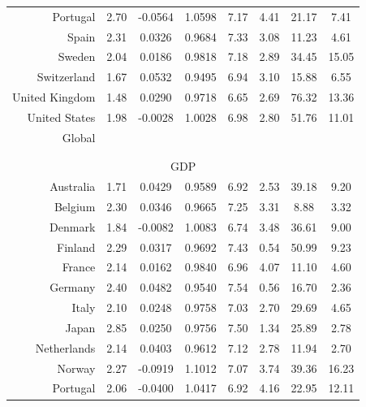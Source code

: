 {{\begin{table}[p]
\begin{center}
\begin{tabular}{rccccccc}
Portugal & 2.70 & -0.0564 & 1.0598 & 7.17 & 4.41 & 21.17 &  7.41\\ 

Spain & 2.31 & 0.0326 & 0.9684 & 7.33 & 3.08 & 11.23 &  4.61\\ 

Sweden & 2.04 & 0.0186 & 0.9818 & 7.18 & 2.89 & 34.45 &  15.05\\ 

Switzerland & 1.67 & 0.0532 & 0.9495 & 6.94 & 3.10 & 15.88 &  6.55\\ 

United Kingdom & 1.48 & 0.0290 & 0.9718 & 6.65 & 2.69 & 76.32 &  13.36\\ 

United States & 1.98 & -0.0028 & 1.0028 & 6.98 & 2.80 & 51.76 &  11.01\\
\hline
Global & & & & & & &\\
\hline
 & & & & & \\
  & & & & & \\
\hline
\multicolumn{8}{c}{GDP}\\
\hline
Australia & 1.71 & 0.0429 & 0.9589 & 6.92 & 2.53 & 39.18 & 9.20\\ 

Belgium & 2.30 & 0.0346 & 0.9665 & 7.25 & 3.31 & 8.88 &  3.32\\ 

Denmark & 1.84 & -0.0082 & 1.0083 & 6.74 & 3.48 & 36.61 &  9.00\\ 

Finland & 2.29 & 0.0317 & 0.9692 & 7.43 & 0.54 & 50.99 &  9.23\\ 

France & 2.14 & 0.0162 & 0.9840 & 6.96 & 4.07 & 11.10 &  4.60\\ 

Germany & 2.40 & 0.0482 & 0.9540 & 7.54 & 0.56 & 16.70 &  2.36\\ 

Italy & 2.10 & 0.0248 & 0.9758 & 7.03 & 2.70 & 29.69 &  4.65\\ 

Japan & 2.85 & 0.0250 & 0.9756 & 7.50 & 1.34 & 25.89 &  2.78\\ 

Netherlands & 2.14 & 0.0403 & 0.9612 & 7.12 & 2.78 & 11.94 &  2.70\\ 

Norway & 2.27 & -0.0919 & 1.1012 & 7.07 & 3.74 & 39.36 &  16.23\\ 

Portugal & 2.06 & -0.0400 & 1.0417 & 6.92 & 4.16 & 22.95 &  12.11\\ 


\end{tabular}
\end{center}
\end{table}}}
